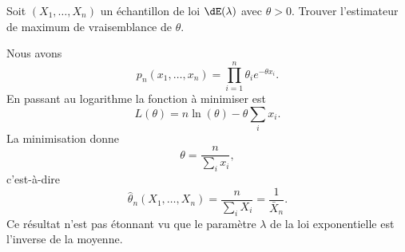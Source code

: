 \begin{example}

	Soit \( (X_1,\ldots,X_n)\) un échantillon de loi \( \dE(\lambda)\) avec \( \theta>0\). Trouver l'estimateur de maximum de vraisemblance de \( \theta\).

	Nous avons
	\begin{equation}
		p_n(x_1,\ldots,x_n)=\prod_{i=1}^n\theta_i e^{-\theta x_i}.
	\end{equation}
	En passant au logarithme la fonction à minimiser est
	\begin{equation}
		L(\theta)=n\ln(\theta)-\theta\sum_i x_i.
	\end{equation}
	La minimisation donne
	\begin{equation}
		\theta=\frac{ n }{ \sum_ix_i },
	\end{equation}
	c'est-à-dire
	\begin{equation}
		\hat\theta_n(X_1,\ldots,X_n)=\frac{ n }{ \sum_iX_i }=\frac{1}{ \bar X_n }.
	\end{equation}
	Ce résultat n'est pas étonnant vu que le paramètre \( \lambda\) de la loi exponentielle est l'inverse de la moyenne.

\end{example}

